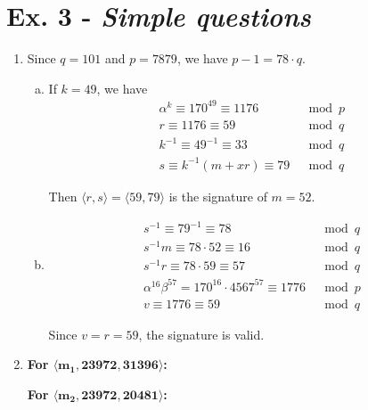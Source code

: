 \documentclass[11pt,a4paper]{article}
\begin{document}
\section*{Ex. 3 - \textit{Simple questions}}
\begin{enumerate}
\item Since $q = 101$ and $p = 7879$, we have $p - 1 = 78 \cdot q$.
	\begin{enumerate}[a)]
	\item If $k = 49$, we have
		\begin{align*}
		\alpha^{k} \equiv 170^{49} \equiv 1176 &\mod p \\
		r \equiv 1176 \equiv 59 &\mod q \\
		k^{-1} \equiv 49^{-1} \equiv 33 &\mod q \\
		s \equiv k^{-1}(m+xr) \equiv 79 &\mod q
		\end{align*}
	\par Then $\langle r, s \rangle = \langle 59, 79 \rangle$  is the signature of $m = 52$.
	
	\item
		\begin{align*}
		s^{-1} \equiv 79^{-1} \equiv 78 &\mod q \\
		s^{-1}m \equiv 78 \cdot 52 \equiv 16 &\mod q \\
		s^{-1}r \equiv 78 \cdot 59 \equiv 57 &\mod q \\
		\alpha^{16}\beta^{57}=170^{16}\cdot 4567^{57} \equiv 1776 &\mod p \\
		v \equiv 1776 \equiv 59 &\mod q
		\end{align*}
	\par Since $v = r = 59$, the signature is valid.
	\end{enumerate}

\item \textbf{For $\mathbf{\langle m_{1}, 23972, 31396 \rangle}$:}
\par \textbf{For $\mathbf{\langle m_{2}, 23972, 20481} \rangle$:}


\end{enumerate}
\end{document}
